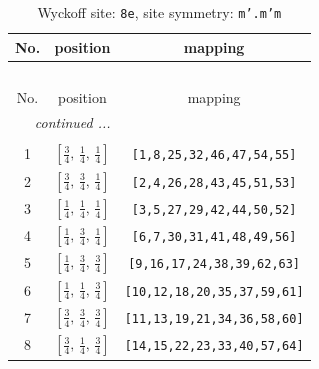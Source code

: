 \documentclass[fleqn,8pt]{jsarticle}
\begin{document}
\begin{longtable}{ccc}
\caption{Wyckoff site: {\tt 8e}, site symmetry: {\tt m'.m'm}}
 \\
 \hline \hline
No. & position & mapping \\ \hline \endfirsthead

\multicolumn{2}{l}{\tablename\ \thetable{}} \\
 \hline \hline
No. & position & mapping \\ \hline \endhead

 \hline \hline
\multicolumn{2}{r}{\footnotesize\it continued ...} \\ \endfoot

 \hline \hline
\multicolumn{2}{r}{} \\ \endlastfoot

1 & $\left[ \frac{3}{4},\, \frac{1}{4},\, \frac{1}{4} \right]$ & {\tt [1,8,25,32,46,47,54,55]} \\ \hline
2 & $\left[ \frac{3}{4},\, \frac{3}{4},\, \frac{1}{4} \right]$ & {\tt [2,4,26,28,43,45,51,53]} \\ \hline
3 & $\left[ \frac{1}{4},\, \frac{1}{4},\, \frac{1}{4} \right]$ & {\tt [3,5,27,29,42,44,50,52]} \\ \hline
4 & $\left[ \frac{1}{4},\, \frac{3}{4},\, \frac{1}{4} \right]$ & {\tt [6,7,30,31,41,48,49,56]} \\ \hline
5 & $\left[ \frac{1}{4},\, \frac{3}{4},\, \frac{3}{4} \right]$ & {\tt [9,16,17,24,38,39,62,63]} \\ \hline
6 & $\left[ \frac{1}{4},\, \frac{1}{4},\, \frac{3}{4} \right]$ & {\tt [10,12,18,20,35,37,59,61]} \\ \hline
7 & $\left[ \frac{3}{4},\, \frac{3}{4},\, \frac{3}{4} \right]$ & {\tt [11,13,19,21,34,36,58,60]} \\ \hline
8 & $\left[ \frac{3}{4},\, \frac{1}{4},\, \frac{3}{4} \right]$ & {\tt [14,15,22,23,33,40,57,64]} \\
\end{longtable}
\renewcommand{\arraystretch}{1.2}
\end{document}
